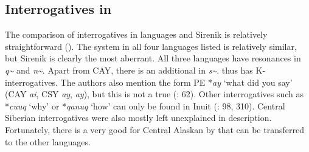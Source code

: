 \subsection{Interrogatives in }\label{sec:5.4.3}

The comparison of interrogatives in  languages and Sirenik is relatively straightforward (). The  system in all four languages listed is relatively similar, but Sirenik is clearly the most aberrant. All three languages have resonances in \textit{q{\textasciitilde}} and \textit{n{\textasciitilde}}. Apart from CAY, there is an additional  in \textit{s{\textasciitilde}}.  thus has K-interrogatives. The authors also mention the form PE *\textit{ay} ‘what did you say’ (CAY \textit{ai}, CSY \textit{ay},   \textit{ay}), but this is not a true  (\citealt{FortescueJacobsonKaplan2010}: 62). Other interrogatives such as *\textit{cuuq} ‘why’ or *\textit{qanuq} ‘how’ can only be found in Inuit (\citealt{FortescueJacobsonKaplan2010}: 98, 310). Central Siberian  interrogatives were also mostly left unexplained in  description. Fortunately, there is a very good  for Central Alaskan  by \cite[443-461]{Miyaoka2012} that can be transferred to the other languages.

